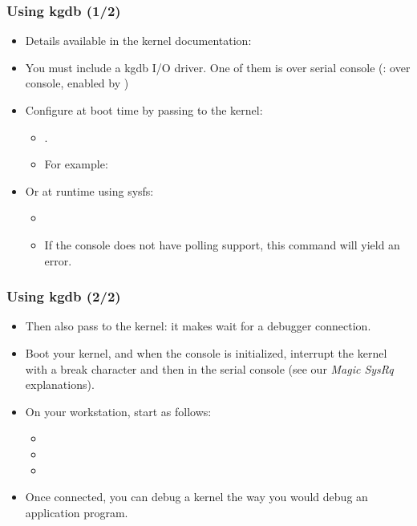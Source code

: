 \begin{frame}
  \frametitle{Using kgdb (1/2)}
  \begin{itemize}
  \item Details available in the kernel documentation:
  \item You must include a kgdb I/O driver. One of them is  over
    serial console (:  over console, enabled by
    )
  \item Configure  at boot time by passing to the kernel:
    \begin{itemize}
    \item {}.
    \item For example: 
    \end{itemize}
  \item Or at runtime using sysfs:
   \begin{itemize}
   \item {}
   \item If the console does not have polling support, this command will yield
         an error.
   \end{itemize}
  \end{itemize}
\end{frame}

\begin{frame}
  \frametitle{Using kgdb (2/2)}
  \begin{itemize}
  \item Then also pass  to the kernel: it makes
     wait for a debugger connection.
  \item Boot your kernel, and when the console is initialized,
    interrupt the kernel with a break character and then 
    in the serial console (see our {\em Magic SysRq} explanations).
  \item On your workstation, start  as follows:
    \begin{itemize}
    \item {}
    \item {}
    \item {}
    \end{itemize}
  \item Once connected, you can debug a kernel the way you would debug
    an application program.
  \end{itemize}
\end{frame}